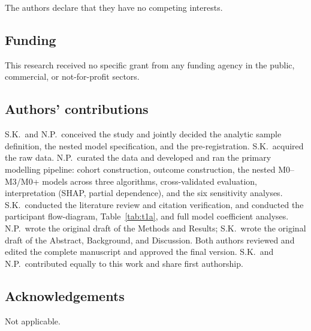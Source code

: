 \documentclass[12pt]{article}
\begin{document}
The authors declare that they have no competing interests.

\subsection*{Funding}

This research received no specific grant from any funding agency in the public, commercial, or not-for-profit sectors.

\subsection*{Authors' contributions}

S.K.\ and N.P.\ conceived the study and jointly decided the analytic sample definition, the nested model specification, and the pre-registration. S.K.\ acquired the raw data. N.P.\ curated the data and developed and ran the primary modelling pipeline: cohort construction, outcome construction, the nested M0--M3/M0+ models across three algorithms, cross-validated evaluation, interpretation (SHAP, partial dependence), and the six sensitivity analyses. S.K.\ conducted the literature review and citation verification, and conducted the participant flow-diagram, Table~\ref{tab:t1a}, and full model coefficient analyses. N.P.\ wrote the original draft of the Methods and Results; S.K.\ wrote the original draft of the Abstract, Background, and Discussion. Both authors reviewed and edited the complete manuscript and approved the final version. S.K.\ and N.P.\ contributed equally to this work and share first authorship.

\subsection*{Acknowledgements}

Not applicable.
\end{document}
